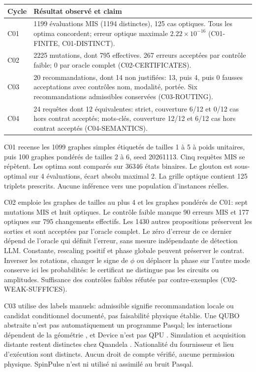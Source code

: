 \documentclass{article}
\begin{document}
\begin{center}
\begin{tabular}{l p{9cm}}
Cycle & Résultat observé et claim\\ \hline
C01 & 1199 évaluations MIS (1194 distinctes), 125 cas optiques.
Tous les optima concordent; erreur optique maximale
$2.22\times10^{-16}$ (C01-FINITE, C01-DISTINCT).\\
C02 & 2225 mutations, dont 795 effectives.
267 erreurs acceptées par contrôle faible; 0 par oracle complet
(C02-CERTIFICATES).\\
C03 & 20 recommandations, dont 14 non justifiées:
13, puis 4, puis 0 fausses acceptations avec contrôles nom, modalité, portée.
Six recommandations admissibles conservées (C03-ROUTING).\\
C04 & 24 requêtes dont 12 équivalentes:
strict, couverture 6/12 et 0/12 cas hors contrat acceptés;
mots-clés, couverture 12/12 et 6/12 cas hors contrat acceptés
(C04-SEMANTICS).\\ \hline
\end{tabular}
\end{center}

C01 recense les 1099 graphes simples étiquetés de tailles 1 à 5 à poids
unitaires, puis 100 graphes pondérés de tailles 2 à 6, seed 20261113.
Cinq requêtes MIS se répètent. Les optima sont comparés sur 36346 états
binaires. Le glouton est sous-optimal sur 4 évaluations, écart absolu maximal 2.
La grille optique contient 125 triplets prescrits. Aucune inférence vers une
population d'instances réelles.

C02 emploie les graphes de tailles au plus 4 et les graphes pondérés de C01:
sept mutations MIS et huit optiques. Le contrôle faible manque 90 erreurs MIS
et 177 optiques sur 795 changements effectifs. Les 1430 autres propositions
préservent les sorties et sont acceptées par l'oracle complet.
Le zéro d'erreur de ce dernier dépend de l'oracle qui définit l'erreur,
sans mesure indépendante de détection LLM.
Constante, rescaling positif et phase globale peuvent préserver le contrat.
Inverser les rotations, changer le signe de $\phi$ ou déplacer la phase sur
l'autre mode conserve ici les probabilités: le certificat ne distingue
pas les circuits ou amplitudes. Suffisance des contrôles faibles réfutée
par contre-exemples (C02-WEAK-SUFFICES).

C03 utilise des labels manuels: admissible signifie recommandation locale
ou candidat conditionnel documenté, pas faisabilité physique établie.
Une QUBO abstraite n'est pas automatiquement un programme Pasqal;
les interactions dépendent de la géométrie \cite{register}, et Device
n'est pas QPU \cite{hardware}. Simulation et acquisition distante restent
distinctes chez Quandela \cite{computer}.
Nationalité du fournisseur et lieu d'exécution sont distincts.
Aucun droit de compte vérifié, aucune permission physique.
SpinPulse n'est ni utilisé ni assimilé au bruit Pasqal.
\end{document}
